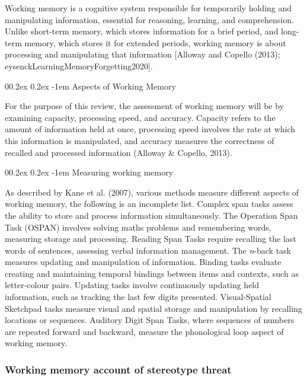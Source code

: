 \documentclass[
  stu, a4paper,floatsintext]{apa7}
\makeatletter
\let\oldparagraph\paragraph
\renewcommand{\paragraph}[1]{\oldparagraph{#1}\mbox{}}
\renewcommand{\paragraph}{\@startsection{paragraph}{4}{\parindent}%
  {0\baselineskip \@plus 0.2ex \@minus 0.2ex}%
  {-1em}%
  {\normalfont\normalsize\bfseries\itshape\typesectitle}}
\renewcommand{\paragraph}{\@startsection{paragraph}{4}{\parindent}%
  {0\baselineskip \@plus 0.2ex \@minus 0.2ex}%
  {-1em}%
  {\normalfont\normalsize\bfseries\typesectitle}}
\makeatother
\begin{document}
Working memory is a cognitive system responsible for temporarily holding and manipulating information, essential for reasoning, learning, and comprehension.
Unlike short-term memory, which stores information for a brief period, and long-term memory, which stores it for extended periods, working memory is about processing and manipulating that information {[}Alloway and Copello (2013); eysenckLearningMemoryForgetting2020{]}.

\paragraph{Aspects of Working Memory}\label{aspects-of-working-memory}

For the purpose of this review, the assessment of working memory will be by examining capacity, processing speed, and accuracy.
Capacity refers to the amount of information held at once, processing speed involves the rate at which this information is manipulated, and accuracy measures the correctness of recalled and processed information (Alloway \& Copello, 2013).

\paragraph{Measuring working memory}\label{measuring-working-memory}

As described by Kane et al. (2007), various methods measure different aspects of working memory, the following is an incomplete list.
Complex span tasks assess the ability to store and process information simultaneously.
The Operation Span Task (OSPAN) involves solving maths problems and remembering words, measuring storage and processing.
Reading Span Tasks require recalling the last words of sentences, assessing verbal information management.
The \emph{n}-back task measures updating and manipulation of information.
Binding tasks evaluate creating and maintaining temporal bindings between items and contexts, such as letter-colour pairs.
Updating tasks involve continuously updating held information, such as tracking the last few digits presented.
Visual-Spatial Sketchpad tasks measure visual and spatial storage and manipulation by recalling locations or sequences.
Auditory Digit Span Tasks, where sequences of numbers are repeated forward and backward, measure the phonological loop aspect of working memory.

\subsubsection{Working memory account of stereotype threat}\label{working-memory-account-of-stereotype-threat}
\end{document}
